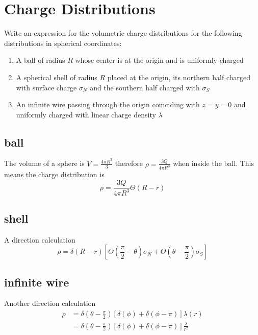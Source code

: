 \clearpage
\section{Charge Distributions}
\begin{colbox}
	Write an expression for the volumetric charge distributions for the following distributions in spherical coordinates:
    \begin{enumerate}
        \item A ball of radius \(R\) whose center is at the origin and is uniformly charged
        \item A spherical shell of radius \(R\) placed at the origin, its northern half charged with surface charge \(\sigma_N\) and the southern half charged with \(\sigma_S\)
        \item An infinite wire passing through the origin coinciding with \(z=y=0\) and uniformly charged with linear charge density \(\lambda\)
    \end{enumerate}
\end{colbox}
\subsection{ball}
The volume of a sphere is \(V=\frac{4\pi R^3}{3}\) therefore \(\rho=\frac{3Q}{4\pi R^3}\) when inside the ball. This means the charge distribution is
\begin{equation}
  \rho=\frac{3Q}{4\pi R^3}\Theta(R-r)
\end{equation}
\subsection{shell}
A direction calculation
\begin{equation}
  \rho = \delta(R-r)\left[\Theta\left(\frac{\pi}{2}-\theta\right)\sigma_N+\Theta\left(\theta-\frac{\pi}{2}\right)\sigma_S\right]
\end{equation}
\subsection{infinite wire}
Another direction calculation
\begin{align}
  \rho &= \delta\left(\theta-\frac{\pi}{2}\right)\left[\delta(\phi)+\delta(\phi-\pi)\right]\lambda(r)\\
  &= \delta\left(\theta-\frac{\pi}{2}\right)\left[\delta(\phi)+\delta(\phi-\pi)\right]\frac{\lambda}{r^2}
\end{align}